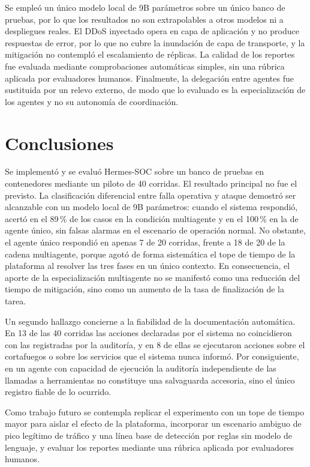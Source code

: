 \documentclass[conference]{IEEEtran}
\begin{document}
Se empleó un único modelo local de 9B parámetros sobre un único banco de pruebas, por
lo que los resultados no son extrapolables a otros modelos ni a despliegues reales.
El DDoS inyectado opera en capa de aplicación y no produce respuestas de error, por lo
que no cubre la inundación de capa de transporte, y la mitigación no contempló el
escalamiento de réplicas. La calidad de los reportes fue evaluada mediante
comprobaciones automáticas simples, sin una rúbrica aplicada por evaluadores humanos.
Finalmente, la delegación entre agentes fue sustituida por un relevo externo, de modo
que lo evaluado es la especialización de los agentes y no su autonomía de coordinación.

\section{Conclusiones}
Se implementó y se evaluó Hermes-SOC sobre un banco de pruebas en contenedores
mediante un piloto de 40 corridas. El resultado principal no fue el previsto. La
clasificación diferencial entre falla operativa y ataque demostró ser alcanzable con
un modelo local de 9B parámetros: cuando el sistema respondió, acertó en el 89\,\% de
los casos en la condición multiagente y en el 100\,\% en la de agente único, sin
falsas alarmas en el escenario de operación normal. No obstante, el agente único
respondió en apenas 7 de 20 corridas, frente a 18 de 20 de la cadena multiagente,
porque agotó de forma sistemática el tope de tiempo de la plataforma al resolver las
tres fases en un único contexto. En consecuencia, el aporte de la especialización
multiagente no se manifestó como una reducción del tiempo de mitigación, sino como un
aumento de la tasa de finalización de la tarea.

Un segundo hallazgo concierne a la fiabilidad de la documentación automática. En 13 de
las 40 corridas las acciones declaradas por el sistema no coincidieron con las
registradas por la auditoría, y en 8 de ellas se ejecutaron acciones sobre el
cortafuegos o sobre los servicios que el sistema nunca informó. Por consiguiente, en
un agente con capacidad de ejecución la auditoría independiente de las llamadas a
herramientas no constituye una salvaguarda accesoria, sino el único registro fiable de
lo ocurrido.

Como trabajo futuro se contempla replicar el experimento con un tope de tiempo mayor
para aislar el efecto de la plataforma, incorporar un escenario ambiguo de pico
legítimo de tráfico y una línea base de detección por reglas sin modelo de lenguaje, y
evaluar los reportes mediante una rúbrica aplicada por evaluadores humanos.
\end{document}
